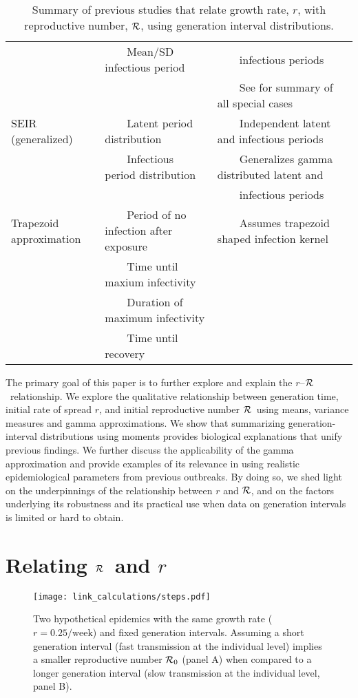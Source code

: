 \documentclass[12pt]{article}
\newcommand{\rR}{\mbox{$r$--$\cal R$}}
\newcommand{\RR}{\ensuremath{{\cal R}}}
\newcommand{\Rx}[1]{\ensuremath{{\cal R}_{#1}}}
\newcommand{\Ro}{\Rx{0}}
\newcommand{\tlab}[1]{\label{tab:#1}}
\newcommand{\tabitem}{~~\llap{\textbullet}~~}
\newcommand{\tabphant}{\hphantom\tabitem}
\begin{document}
{\begin{landscape}
\begin{table}[h]
\begin{tabular}{l|l|l|c}
& \tabitem Mean/SD infectious period & \tabphant infectious periods & \\
& & \tabitem See \cite{yan2008separate} for summary of all special cases & \\
\hline
SEIR (generalized) & \tabitem Latent period distribution & \tabitem Independent latent and infectious periods & \cite{yan2008separate} \\
 & \tabitem Infectious period distribution & \tabitem Generalizes gamma distributed latent and & \\
 & & \tabphant infectious periods & \\
\hline
Trapezoid approximation & \tabitem Period of no infection after exposure & \tabitem Assumes trapezoid shaped infection kernel & \cite{roberts2007model} \\
& \tabitem Time until maxium infectivity& & \\
& \tabitem Duration of maximum infectivity & & \\
& \tabitem Time until recovery & &\\
\hline
\end{tabular}
\caption{
Summary of previous studies that relate growth rate, $r$, with reproductive number, $\RR$, using generation interval distributions.
}
\tlab{review}
\end{table}
\end{landscape}
}

The primary goal of this paper is to further explore and explain the \rR\ relationship.
We explore the qualitative relationship between generation time, initial rate of spread $r$, and initial reproductive number \RR\ using means, variance measures and gamma approximations.
We show that summarizing generation-interval distributions using moments provides biological explanations that unify previous findings.
We further discuss the applicability of the gamma approximation and provide examples of its relevance in using realistic epidemiological parameters from previous outbreaks. 
By doing so, we shed light on the underpinnings of the relationship between $r$ and \RR, and on the factors underlying its robustness and its practical use when data on generation intervals is limited or hard to obtain.

\section{Relating \RR\ and $r$}

\begin{figure}[htbp] \centering
	\texttt{[image: link\_calculations/steps.pdf]}
	\caption{Two hypothetical epidemics with the same growth rate ($r=0.25/\mathrm{week}$) and fixed generation intervals.  Assuming a short generation interval (fast transmission at the individual level) implies a smaller reproductive number $\Ro$ (panel A) when compared to a longer generation interval (slow transmission at the individual level, panel B). 
	\label{fig:link}}
\end{figure}
\end{document}
